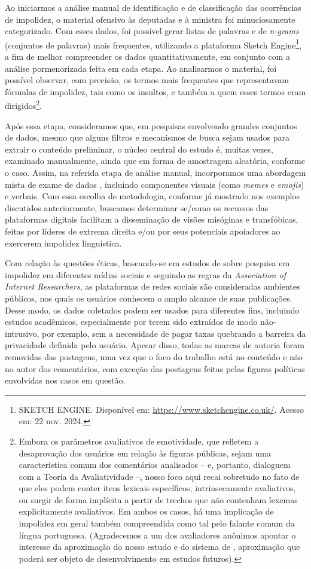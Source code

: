 \documentclass[portuguese]{textolivre}
\begin{document}
Ao iniciarmos a análise manual de identificação e de classificação das ocorrências de impolidez, o material ofensivo às deputadas e à ministra foi minuciosamente categorizado. Com esses dados, foi possível gerar listas de palavras e de \textit{n-grams} (conjuntos de palavras) mais frequentes, utilizando a plataforma Sketch Engine\footnote{SKETCH ENGINE. Disponível em: \url{https://www.sketchengine.co.uk/}. Acesso em: 22 nov. 2024.}, a fim de melhor compreender os dados quantitativamente, em conjunto com a análise pormenorizada feita em cada etapa. Ao analisarmos o material, foi possível observar, com precisão, os termos mais frequentes que representavam fórmulas de impolidez, tais como os insultos, e também a quem esses termos eram dirigidos\footnote{Embora os parâmetros avaliativos de emotividade, que refletem a desaprovação dos usuários em relação às figuras públicas, sejam uma característica comum dos comentários analisados -- e, portanto, dialoguem com a Teoria da Avaliatividade \cite{martin2005} --, nosso foco aqui recai sobretudo no fato de que eles podem conter itens lexicais específicos, intrinsecamente avaliativos, ou surgir de forma implícita a partir de trechos que não contenham lexemas explicitamente avaliativos. Em ambos os casos, há uma implicação de impolidez em geral também compreendida como tal pelo falante comum da língua portuguesa. (Agradecemos a um dos avaliadores anônimos apontar o interesse da aproximação do nosso estudo e do sistema de \textcite{martin2005}, aproximação que poderá ser objeto de desenvolvimento em estudos futuros).}.

Após essa etapa, consideramos que, em pesquisas envolvendo grandes conjuntos de dados, mesmo que alguns filtros e mecanismos de busca sejam usados para extrair o conteúdo preliminar, o núcleo central do estudo é, muitas vezes, examinado manualmente, ainda que em forma de amostragem aleatória, conforme o caso. Assim, na referida etapa de análise manual, incorporamos uma abordagem mista de exame de dados \cite{unger2016}, incluindo componentes visuais (como \textit{memes} e \textit{emojis}) e verbais. Com essa escolha de metodologia, conforme já mostrado nos exemplos discutidos anteriormente, buscamos determinar se/como os recursos das plataformas digitais facilitam a disseminação de visões misóginas e transfóbicas, feitas por líderes de extrema direita e/ou por seus potenciais apoiadores ao exercerem impolidez linguística.

Com relação às questões éticas, baseando-se em estudos de \textcite{dynel2023} sobre pesquisa em impolidez em diferentes mídias sociais e seguindo as regras da \textit{Association of Internet Researchers}, as plataformas de redes sociais são consideradas ambientes públicos, nos quais os usuários conhecem o amplo alcance de suas publicações. Desse modo, os dados coletados podem ser usados para diferentes fins, incluindo estudos acadêmicos, especialmente por terem sido extraídos de modo não-intrusivo, por exemplo, sem a necessidade de pagar taxas quebrando a barreira da privacidade definida pelo usuário. Apesar disso, todas as marcas de autoria foram removidas das postagens, uma vez que o foco do trabalho está no conteúdo e não no autor dos comentários, com exceção das postagens feitas pelas figuras políticas envolvidas nos casos em questão.
\end{document}
